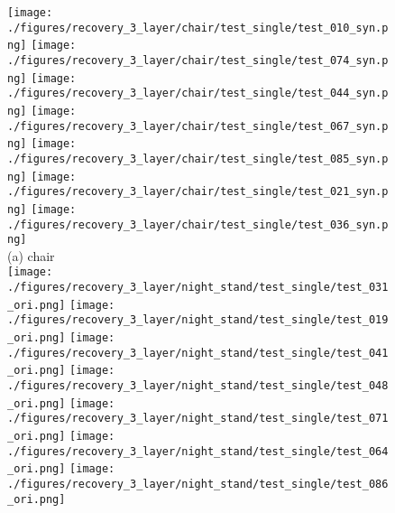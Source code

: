 \documentclass[10pt,twocolumn,letterpaper]{article}
\begin{document}
\begin{figure}
     \texttt{[image: ./figures/recovery\_3\_layer/chair/test\_single/test\_010\_syn.png]} \hspace{-1.8mm}
     \texttt{[image: ./figures/recovery\_3\_layer/chair/test\_single/test\_074\_syn.png]} \hspace{-1.8mm}
    \texttt{[image: ./figures/recovery\_3\_layer/chair/test\_single/test\_044\_syn.png]} \hspace{-1.8mm}
    \texttt{[image: ./figures/recovery\_3\_layer/chair/test\_single/test\_067\_syn.png]} \hspace{-1.8mm}
    \texttt{[image: ./figures/recovery\_3\_layer/chair/test\_single/test\_085\_syn.png]} \hspace{-1.8mm}
    \texttt{[image: ./figures/recovery\_3\_layer/chair/test\_single/test\_021\_syn.png]} \hspace{-1.8mm}
    \texttt{[image: ./figures/recovery\_3\_layer/chair/test\_single/test\_036\_syn.png]}\\
    (a) chair\\
    \vspace{2mm}
    \texttt{[image: ./figures/recovery\_3\_layer/night\_stand/test\_single/test\_031\_ori.png]} \hspace{-1.8mm}
    \texttt{[image: ./figures/recovery\_3\_layer/night\_stand/test\_single/test\_019\_ori.png]} \hspace{-1.8mm}
    \texttt{[image: ./figures/recovery\_3\_layer/night\_stand/test\_single/test\_041\_ori.png]} \hspace{-1.8mm}
    \texttt{[image: ./figures/recovery\_3\_layer/night\_stand/test\_single/test\_048\_ori.png]} \hspace{-1.8mm}
    \texttt{[image: ./figures/recovery\_3\_layer/night\_stand/test\_single/test\_071\_ori.png]} \hspace{-1.8mm}
    \texttt{[image: ./figures/recovery\_3\_layer/night\_stand/test\_single/test\_064\_ori.png]} \hspace{-1.8mm}
    \texttt{[image: ./figures/recovery\_3\_layer/night\_stand/test\_single/test\_086\_ori.png]} \hspace{-1.8mm}\\

\end{figure}
\end{document}
